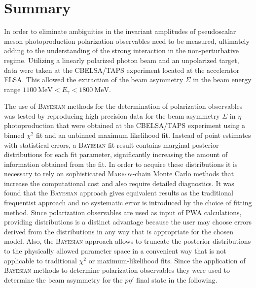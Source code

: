 \chapter{Summary}

In order to eliminate ambiguities in the invariant amplitudes of pseudoscalar meson photoproduction polarization observables need to be measured, ultimately adding to the understanding of the strong interaction in the non-perturbative regime. Utilizing a linearly polarized photon beam and an unpolarized target, data were taken at the CBELSA/TAPS experiment located at the accelerator ELSA. This allowed the extraction of the beam  asymmetry $\Sigma$ in the beam energy range $\SI{1100}{\mega\eV}<E_\gamma<\SI{1800}{\mega\eV}$.

The use of \textsc{Bayesian} methods for the determination of polarization observables was tested by reproducing high precision data for the beam asymmetry $\Sigma$ in $\eta$ photoproduction that were obtained at the CBELSA/TAPS experiment using a binned $\chi^2$ fit and an unbinned maximum likelihood fit. Instead of point estimates with statistical errors, a \textsc{Bayesian} fit result contains marginal posterior distributions for each fit parameter, significantly increasing the amount of information obtained from the fit. In order to acquire these distributions it is necessary to rely on sophisticated \textsc{Markov}-chain Monte Carlo methods that increase the computational cost and also require detailed diagnostics. It was found that the \textsc{Bayesian} approach gives equivalent results as the traditional frequentist approach and no systematic error is introduced by the choice of fitting method. Since polarization observables are used as input of PWA calculations, providing distributions is a distinct advantage because the user may choose errors derived from the distributions in any way that is appropriate for the chosen model. Also, the \textsc{Bayesian} approach allows to truncate the posterior distributions to the physically allowed parameter space in a convenient way that is not applicable to traditional $\chi^2$ or maximum-likelihood fits. Since the application of \textsc{Bayesian} methods to determine polarization observables they were used to determine the beam asymmetry for the $p\eta'$ final state in the following.
 
